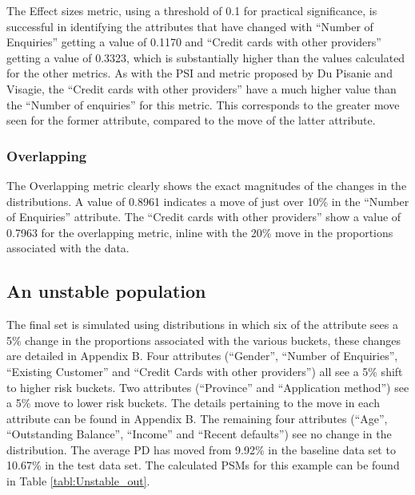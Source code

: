 \documentclass{article}
\theoremstyle{def}
\begin{document}
The Effect sizes metric, using a threshold of 0.1 for practical significance, is successful in identifying the attributes that have changed with ``Number of Enquiries'' getting a value of 0.1170 and ``Credit cards with other providers'' getting a value of 0.3323, which is substantially higher than the values calculated for the other metrics. As with the PSI and metric proposed by Du Pisanie and Visagie, the ``Credit cards with other providers'' have a much higher value than the ``Number of enquiries'' for this metric. This corresponds to the greater move seen for the former attribute, compared to the move of the latter attribute.

\subsubsection{Overlapping}

The Overlapping metric clearly shows the exact magnitudes of the changes in the distributions. A value of 0.8961 indicates a move of just over 10\% in the ``Number of Enquiries'' attribute. The ``Credit cards with other providers'' show a value of 0.7963 for the overlapping metric, inline with the 20\% move in the proportions associated with the data.

\subsection{An unstable population}

The final set is simulated using distributions in which six of the attribute sees a 5\% change in the proportions associated with the various buckets, these changes are detailed in Appendix B.
Four attributes (``Gender'', ``Number of Enquiries'', ``Existing Customer'' and ``Credit Cards with other providers'') all see a 5\% shift to higher risk buckets. Two attributes (``Province'' and ``Application method'') see a 5\% move to lower risk buckets. The details pertaining to the move in each attribute can be found in Appendix B. The remaining four attributes (``Age'', ``Outstanding Balance'', ``Income'' and ``Recent defaults'') see no change in the distribution. The average PD has moved from 9.92\% in the baseline data set to 10.67\% in the test data set. The calculated PSMs for this example can be found in Table \ref{tabl:Unstable_out}.
\end{document}
